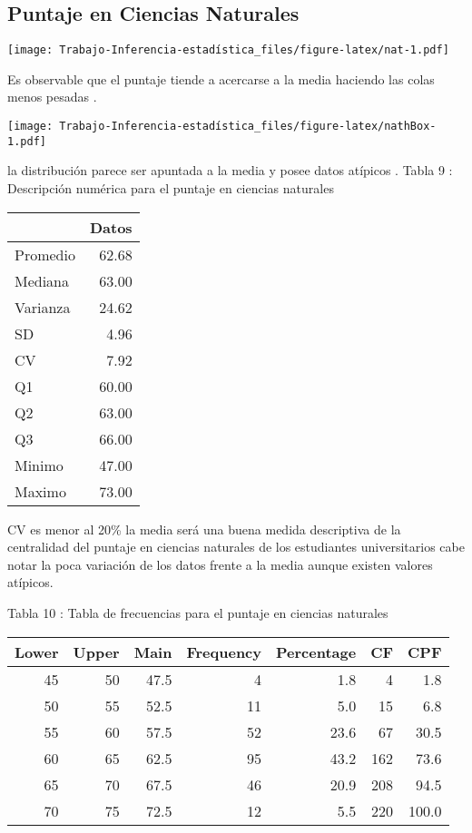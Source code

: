 \documentclass[
  man]{apa6}
\begin{document}
\hypertarget{puntaje-en-ciencias-naturales}{%
\subsection{Puntaje en Ciencias Naturales}\label{puntaje-en-ciencias-naturales}}

\texttt{[image: Trabajo-Inferencia-estadística\_files/figure-latex/nat-1.pdf]}

Es observable que el puntaje tiende a acercarse a la media haciendo las
colas menos pesadas .

\texttt{[image: Trabajo-Inferencia-estadística\_files/figure-latex/nathBox-1.pdf]}

la distribución parece ser apuntada a la media y posee datos atípicos .
\clearpage Tabla 9 : Descripción numérica para el puntaje en ciencias
naturales

\begin{center}

\begin{tabular}{l|r}
\hline
  & Datos\\
\hline
Promedio & 62.68\\
\hline
Mediana & 63.00\\
\hline
Varianza & 24.62\\
\hline
SD & 4.96\\
\hline
CV & 7.92\\
\hline
Q1 & 60.00\\
\hline
Q2 & 63.00\\
\hline
Q3 & 66.00\\
\hline
Minimo & 47.00\\
\hline
Maximo & 73.00\\
\hline
\end{tabular}
\end{center}

CV es menor al 20\% la media será una buena medida descriptiva de la
centralidad del puntaje en ciencias naturales de los estudiantes
universitarios cabe notar la poca variación de los datos frente a la
media aunque existen valores atípicos.

Tabla 10 : Tabla de frecuencias para el puntaje en ciencias naturales

\begin{center}


\begin{tabular}{r|r|r|r|r|r|r}
\hline
Lower & Upper & Main & Frequency & Percentage & CF & CPF\\
\hline
45 & 50 & 47.5 & 4 & 1.8 & 4 & 1.8\\
\hline
50 & 55 & 52.5 & 11 & 5.0 & 15 & 6.8\\
\hline
55 & 60 & 57.5 & 52 & 23.6 & 67 & 30.5\\
\hline
60 & 65 & 62.5 & 95 & 43.2 & 162 & 73.6\\
\hline
65 & 70 & 67.5 & 46 & 20.9 & 208 & 94.5\\
\hline
70 & 75 & 72.5 & 12 & 5.5 & 220 & 100.0\\
\hline
\end{tabular}
\end{center}
\end{document}
